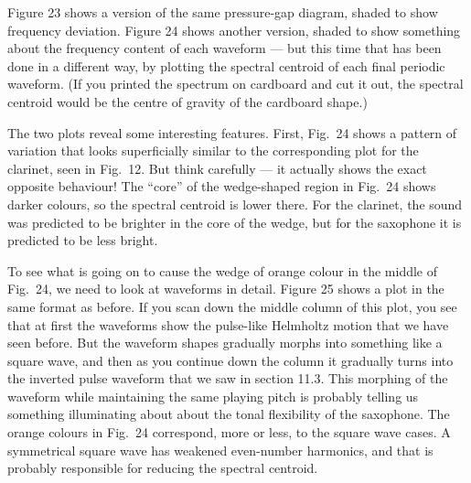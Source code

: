 
  Figure 23 shows a version of the same pressure-gap diagram, shaded to show 
  frequency deviation. Figure 24 shows another version, shaded to show 
  something about the frequency content of each waveform — but this time that 
  has been done in a different way, by plotting the spectral centroid of each 
  final periodic waveform. (If you printed the spectrum on cardboard and cut it 
  out, the spectral centroid would be the centre of gravity of the cardboard 
  shape.) 



  The two plots reveal some interesting features. First, Fig.\ 24 shows a 
  pattern of variation that looks superficially similar to the corresponding 
  plot for the clarinet, seen in Fig.\ 12. But think carefully — it actually 
  shows the exact opposite behaviour! The “core” of the wedge-shaped region in 
  Fig.\ 24 shows darker colours, so the spectral centroid is lower there. For 
  the clarinet, the sound was predicted to be brighter in the core of the 
  wedge, but for the saxophone it is predicted to be less bright. 

  To see what is going on to cause the wedge of orange colour in the middle of 
  Fig.\ 24, we need to look at waveforms in detail. Figure 25 shows a plot in 
  the same format as before. If you scan down the middle column of this plot, 
  you see that at first the waveforms show the pulse-like Helmholtz motion that 
  we have seen before. But the waveform shapes gradually morphs into something 
  like a square wave, and then as you continue down the column it gradually 
  turns into the inverted pulse waveform that we saw in section 11.3. This 
  morphing of the waveform while maintaining the same playing pitch is probably 
  telling us something illuminating about about the tonal flexibility of the 
  saxophone. The orange colours in Fig.\ 24 correspond, more or less, to the 
  square wave cases. A symmetrical square wave has weakened even-number 
  harmonics, and that is probably responsible for reducing the spectral 
  centroid. 

